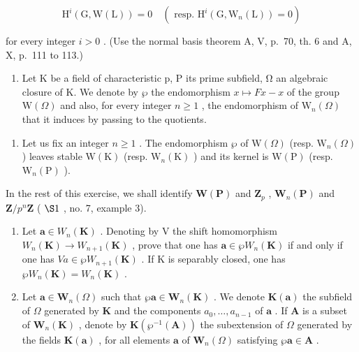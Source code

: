 \[
\mathrm{H} ^ {i} (\mathrm{G}, \mathrm{W} (\mathrm{L})) = 0 \quad (\text { resp. } \mathrm{H} ^ {i} (\mathrm{G}, \mathrm{W} _ {n} (\mathrm{L})) = 0)
\]

for every integer \(i > 0\) . (Use the normal basis theorem A, V, p.~70, th. 6 and A, X, p.~111 to 113.)

\begin{enumerate}
\def\labelenumi{\arabic{enumi})}
\setcounter{enumi}{18}
\tightlist
\item
  Let K be a field of characteristic p, P its prime subfield, Ω an algebraic closure of K. We denote by \(\wp\) the endomorphism \(x \mapsto Fx - x\) of the group \(\mathrm{W}(\Omega)\) and also, for every integer \(n \geqslant 1\) , the endomorphism of \(\mathrm{W}_{n}(\Omega)\) that it induces by passing to the quotients.
\end{enumerate}

\begin{enumerate}
\def\labelenumi{\alph{enumi})}
\tightlist
\item
  Let us fix an integer \(n \geqslant 1\) . The endomorphism \(\wp\) of \(\mathrm{W}(\Omega)\) (resp. \(\mathrm{W}_{n}(\Omega)\) ) leaves stable \(\mathrm{W}(\mathrm{K})\) (resp. \(\mathrm{W}_{n}(\mathrm{K})\) ) and its kernel is \(\mathrm{W}(\mathrm{P})\) (resp. \(\mathrm{W}_{n}(\mathrm{P})\) ).
\end{enumerate}

In the rest of this exercise, we shall identify \(\mathbf{W}(\mathbf{P})\) and \(\mathbf{Z}_p\) , \(\mathbf{W}_n(\mathbf{P})\) and \(\mathbf{Z}/p^n\mathbf{Z}\) ( \(\S 1\) , no. 7, example 3).

\begin{enumerate}
\def\labelenumi{\alph{enumi})}
\setcounter{enumi}{1}
\item
  Let \(\boldsymbol{a} \in W_n(\mathbf{K})\) . Denoting by V the shift homomorphism \(W_n(\mathbf{K}) \to W_{n+1}(\mathbf{K})\) , prove that one has \(\boldsymbol{a} \in \wp W_n(\mathbf{K})\) if and only if one has \(Va \in \wp W_{n+1}(\mathbf{K})\) . If K is separably closed, one has \(\wp W_n(\mathbf{K}) = W_n(\mathbf{K})\) .
\item
  Let \(\pmb{a} \in \mathbf{W}_n(\Omega)\) such that \(\wp \pmb{a} \in \mathbf{W}_n(\mathbf{K})\) . We denote \(\mathbf{K}(\pmb{a})\) the subfield of \(\Omega\) generated by \(\mathbf{K}\) and the components \(a_0, \ldots, a_{n-1}\) of \(\pmb{a}\) . If \(\mathbf{A}\) is a subset of \(\mathbf{W}_n(\mathbf{K})\) , denote by \(\mathbf{K}(\wp^{-1}(\mathbf{A}))\) the subextension of \(\Omega\) generated by the fields \(\mathbf{K}(\pmb{a})\) , for all elements \(\pmb{a}\) of \(\mathbf{W}_n(\Omega)\) satisfying \(\wp \pmb{a} \in \mathbf{A}\) .
\end{enumerate}

